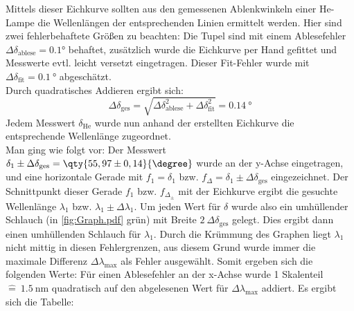 Mittels dieser Eichkurve sollten aus den gemessenen Ablenkwinkeln einer He-Lampe die Wellenlängen der entsprechenden Linien ermittelt werden. Hier sind zwei fehlerbehaftete Größen zu beachten: Die Tupel sind mit einem Ablesefehler \(\Delta \delta_{\text{ablese}} = \ang{0,1}\) behaftet, zusätzlich wurde die Eichkurve per Hand gefittet und Messwerte evtl. leicht versetzt eingetragen. 
Dieser \glqq Fit-Fehler \grqq wurde mit \(\Delta \delta_{\text{fit}}=\qty{0,1}{\degree}\) abgeschätzt.\\
Durch quadratisches Addieren ergibt sich:
\begin{equation}
    \Delta \delta_{\text{ges}}=\sqrt{\Delta \delta_{\text{ablese}}^2+\Delta \delta_{\text{fit}}^2}=\qty{0,14}{\degree}
\end{equation}
Jedem Messwert \(\delta_{\text{He}}\) wurde nun anhand der erstellten Eichkurve die entsprechende Wellenlänge zugeordnet.\\
Man ging wie folgt vor: Der Messwert \(\delta_1\pm \Delta \delta_{\text{ges}}=\qty{55,97 \pm 0,14}{\degree}\) wurde an der y-Achse eingetragen, und eine horizontale Gerade mit \(f_1=\delta_1\) bzw. \(f_{\Delta}=\delta_1 \pm \Delta \delta_{\text{ges}}\) eingezeichnet. 
Der Schnittpunkt dieser Gerade \(f_1\)  bzw. \(f_{\Delta_\pm}\) mit der Eichkurve ergibt die gesuchte Wellenlänge \(\lambda_1\) bzw. \(\lambda_1 \pm \Delta \lambda_1\).
Um jeden Wert für \(\delta\) wurde also ein umhüllender Schlauch (in \cref{fig:Graph.pdf} grün) mit Breite \(2\ \Delta \delta_{\text{ges}}\) gelegt.
Dies ergibt dann einen umhüllenden Schlauch für \(\lambda_1\).
Durch die Krümmung des Graphen liegt \(\lambda_1\) nicht mittig in diesen Fehlergrenzen, aus diesem Grund wurde immer die maximale Differenz \(\Delta \lambda_{\text{max}}\) als Fehler ausgewählt. Somit ergeben sich die folgenden Werte:
Für einen Ablesefehler an der x-Achse wurde 1 Skalenteil \(\widehat{=}\ \qty{1,5}{\nm}\) quadratisch auf den abgelesenen Wert für \(\Delta \lambda_{\text{max}}\) addiert. Es ergibt sich die Tabelle:

